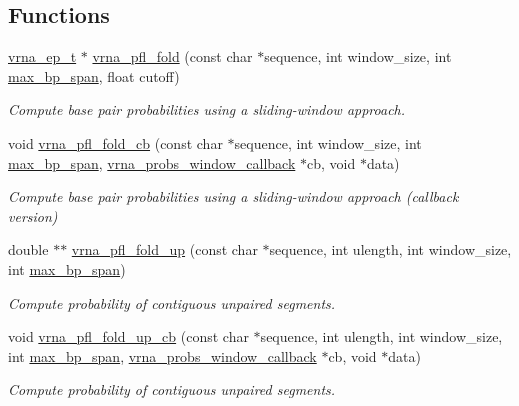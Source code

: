 \subsection*{Functions}
\begin{DoxyCompactItemize}
\item 
\hyperlink{group__struct__utils_gab9ac98ab55ded9fb90043b024b915aca}{vrna\+\_\+ep\+\_\+t} $\ast$ \hyperlink{group__local__pf__fold_ga6267230f20cab0e2315375310b4dad85}{vrna\+\_\+pfl\+\_\+fold} (const char $\ast$sequence, int window\+\_\+size, int \hyperlink{group__model__details_ga18df869af0d70101106458fc3f027806}{max\+\_\+bp\+\_\+span}, float cutoff)
\begin{DoxyCompactList}\small\item\em Compute base pair probabilities using a sliding-\/window approach. \end{DoxyCompactList}\item 
void \hyperlink{group__local__pf__fold_ga8dc3788e66420f524f2bfc0b685a939d}{vrna\+\_\+pfl\+\_\+fold\+\_\+cb} (const char $\ast$sequence, int window\+\_\+size, int \hyperlink{group__model__details_ga18df869af0d70101106458fc3f027806}{max\+\_\+bp\+\_\+span}, \hyperlink{LPfold_8h_abe710a1182e6db69cc75329dfc9bed67}{vrna\+\_\+probs\+\_\+window\+\_\+callback} $\ast$cb, void $\ast$data)
\begin{DoxyCompactList}\small\item\em Compute base pair probabilities using a sliding-\/window approach (callback version) \end{DoxyCompactList}\item 
double $\ast$$\ast$ \hyperlink{group__local__pf__fold_ga1dd5c51b797c961124912e289bff553a}{vrna\+\_\+pfl\+\_\+fold\+\_\+up} (const char $\ast$sequence, int ulength, int window\+\_\+size, int \hyperlink{group__model__details_ga18df869af0d70101106458fc3f027806}{max\+\_\+bp\+\_\+span})
\begin{DoxyCompactList}\small\item\em Compute probability of contiguous unpaired segments. \end{DoxyCompactList}\item 
void \hyperlink{group__local__pf__fold_ga8958d91b1f1aebfb32b58805d141ccf3}{vrna\+\_\+pfl\+\_\+fold\+\_\+up\+\_\+cb} (const char $\ast$sequence, int ulength, int window\+\_\+size, int \hyperlink{group__model__details_ga18df869af0d70101106458fc3f027806}{max\+\_\+bp\+\_\+span}, \hyperlink{LPfold_8h_abe710a1182e6db69cc75329dfc9bed67}{vrna\+\_\+probs\+\_\+window\+\_\+callback} $\ast$cb, void $\ast$data)
\begin{DoxyCompactList}\small\item\em Compute probability of contiguous unpaired segments. \end{DoxyCompactList}\item 
$$
\end{DoxyCompactItemize}
